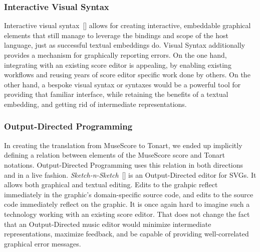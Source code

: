\documentclass[10pt, sigplan]{acmart}
\newcommand{\textsuper}[1]{$^{\hbox{\textsmaller{#1}}}$}
\newcommand{\Ssubsubsection}[2]{\subsubsection[#1]{#2}}
\newcommand{\AutobibLink}[1]{\color{ACMPurple}{#1}}
\newcommand{\Autobibref}[1]{#1}
\providecommand{\AutobibLink}[1]{#1}
\newcommand{\FootnoteTarget}[1]{}
\newenvironment{FootnoteBlock}{\renewcommand{\noindent}{}}{}
\newcommand{\FootnoteBlockContent}[1]{}
\begin{document}
\Ssubsubsection{Interactive Visual Syntax}{Interactive Visual Syntax}\label{t:x28part_x22Interactivex5fVisualx5fSyntaxx22x29}

Interactive visual syntax\Autobibref{~[\hyperref[t:x28autobib_x22Andersenx2c_Leifx2c_Ballantynex2c_Michaelx2c_and_Felleisenx2c_MatthiasAdding_interactive_visual_syntax_to_textual_codeIn_Procx2e_ACM_on_Programming_Languagesx2c_ppx2e_1x2dx2d282020httpsx3ax2fx2fdoix2eorgx2f10x2e1145x2f3428290x22x29]{\AutobibLink{3}}]} allows for creating interactive,
embeddable graphical elements that still manage to leverage the bindings and
scope of the host language, just as successful textual embeddings do.  Visual
Syntax additionally provides a mechanism for graphically reporting errors.  On
the one hand, integrating with an existing score editor is appealing, by
enabling existing workflows and reusing years of score editor specific work done
by others.  On the other hand, a bespoke visual syntax or syntaxes would be a
powerful tool for providing that familiar interface, while retaining the
benefits of a textual embedding, and getting rid of intermediate
representations.

\Ssubsubsection{Output{-}Directed Programming}{Output{-}Directed Programming}\label{t:x28part_x22Outputx2dDirectedx5fProgrammingx22x29}

In creating the translation from MuseScore to Tonart, we ended up implicitly
defining a relation between elements of the MuseScore score and Tonart
notations.  Output{-}Directed Programming uses this relation in both directions
and in a live fashion.  \emph{Sketch{-}n{-}Sketch}\Autobibref{~[\hyperref[t:x28autobib_x22Hempelx2c_Brianx2c_Lubinx2c_Justinx2c_and_Chughx2c_RaviSketchx2dnx2dSketchx3a_Outputx2dDirected_Programming_for_SVGIn_Procx2e_32nd_Annual_ACM_Symposium_on_User_Interface_Software_and_Technologyx2c_ppx2e_281x2dx2d2922019httpsx3ax2fx2fdoix2eorgx2f10x2e1145x2f3332165x2e3347925x22x29]{\AutobibLink{1}}]} is an
Output{-}Directed editor for SVGs.  It allows both graphical and
textual editing.  Edits to the grahpic reflect immediately in the graphic{'}s
domain{-}specific source code, and edits to the source code immediately reflect on
the graphic.  It is once again hard to imagine such a technology working with an
existing score editor.  That does not change the fact that an Output{-}Directed
music editor would minimize intermediate representations, maximize feedback, and
be capable of providing well{-}correlated graphical error messages.\label{t:x28part_x28gentag_4x29x29}

\begin{FootnoteBlock}\FootnoteBlockContent{\FootnoteTarget{\textsuper{\label{t:x28x7ccounterx2dx28x29x7c_x28gentag_5x29x29}\textsf{1}}}In the current implementation, many errors are actually reported
with source locations coming from \emph{inside the MusicXML}. This is somewhat
impressive, but misses the mark from a useability perspective.}\end{FootnoteBlock}
\end{document}
